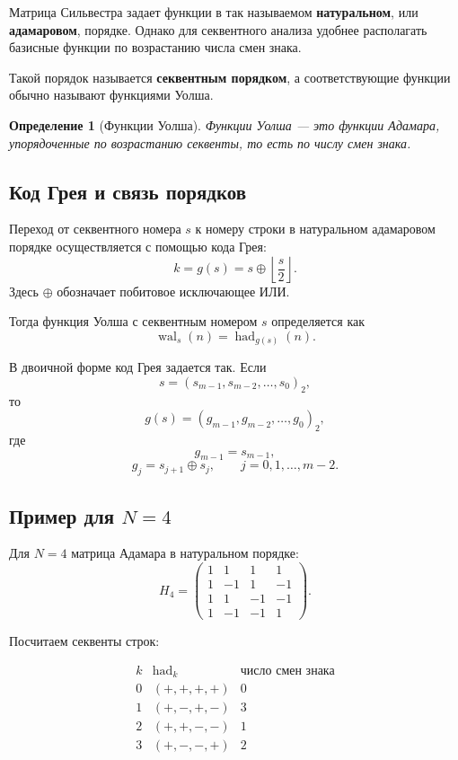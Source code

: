 \documentclass[12pt,a4paper]{article}
\newtheorem{definition}{Определение}
\begin{document}
Матрица Сильвестра задает функции в так называемом \textbf{натуральном}, или \textbf{адамаровом}, порядке. Однако для секвентного анализа удобнее располагать базисные функции по возрастанию числа смен знака.

Такой порядок называется \textbf{секвентным порядком}, а соответствующие функции обычно называют функциями Уолша.

\begin{definition}[Функции Уолша]
Функции Уолша --- это функции Адамара, упорядоченные по возрастанию секвенты, то есть по числу смен знака.
\end{definition}

\subsection{Код Грея и связь порядков}

Переход от секвентного номера $s$ к номеру строки в натуральном адамаровом порядке осуществляется с помощью кода Грея:
\[
    k = g(s)=s\oplus \left\lfloor \frac{s}{2}\right\rfloor.
\]
Здесь $\oplus$ обозначает побитовое исключающее ИЛИ.

Тогда функция Уолша с секвентным номером $s$ определяется как
\[
    \operatorname{wal}_s(n)
    =
    \operatorname{had}_{g(s)}(n).
\]

В двоичной форме код Грея задается так. Если
\[
    s=(s_{m-1},s_{m-2},\ldots,s_0)_2,
\]
то
\[
    g(s)=(g_{m-1},g_{m-2},\ldots,g_0)_2,
\]
где
\[
    g_{m-1}=s_{m-1},
\]
\[
    g_j=s_{j+1}\oplus s_j,\qquad j=0,1,\ldots,m-2.
\]

\subsection{Пример для $N=4$}

Для $N=4$ матрица Адамара в натуральном порядке:
\[
H_4=
\begin{pmatrix}
1&1&1&1\\
1&-1&1&-1\\
1&1&-1&-1\\
1&-1&-1&1
\end{pmatrix}.
\]

Посчитаем секвенты строк:

\[
\begin{array}{c|c|c}
k & \operatorname{had}_k & \text{число смен знака}\\
\hline
0 & (+,+,+,+) & 0\\
1 & (+,-,+,-) & 3\\
2 & (+,+,-,-) & 1\\
3 & (+,-,-,+) & 2
\end{array}
\]
\end{document}
